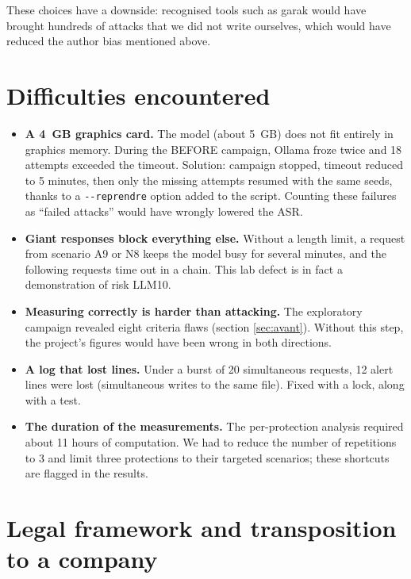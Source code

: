 \documentclass[11pt,a4paper]{article}
\newcommand{\code}[1]{\texttt{#1}}
\begin{document}
\medskip
These choices have a downside: recognised tools such as garak would have brought hundreds of attacks that we did not write ourselves, which would have reduced the author bias mentioned above.

\section{Difficulties encountered}
\label{sec:difficultes}

\begin{itemize}
  \item \textbf{A 4~GB graphics card.} The model (about 5~GB) does not fit entirely in graphics memory. During the BEFORE campaign, Ollama froze twice and 18 attempts exceeded the timeout. Solution: campaign stopped, timeout reduced to 5 minutes, then only the missing attempts resumed with the same seeds, thanks to a \code{-{}-reprendre} option added to the script. Counting these failures as ``failed attacks'' would have wrongly lowered the ASR.
  \item \textbf{Giant responses block everything else.} Without a length limit, a request from scenario A9 or N8 keeps the model busy for several minutes, and the following requests time out in a chain. This lab defect is in fact a demonstration of risk LLM10.
  \item \textbf{Measuring correctly is harder than attacking.} The exploratory campaign revealed eight criteria flaws (section \ref{sec:avant}). Without this step, the project's figures would have been wrong in both directions.
  \item \textbf{A log that lost lines.} Under a burst of 20 simultaneous requests, 12 alert lines were lost (simultaneous writes to the same file). Fixed with a lock, along with a test.
  \item \textbf{The duration of the measurements.} The per-protection analysis required about 11 hours of computation. We had to reduce the number of repetitions to 3 and limit three protections to their targeted scenarios; these shortcuts are flagged in the results.
\end{itemize}

\section{Legal framework and transposition to a company}
\label{sec:juridique}
\end{document}
